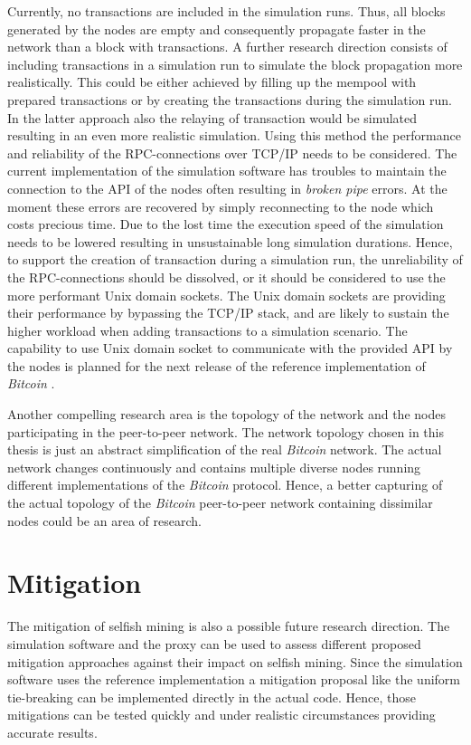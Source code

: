 Currently, no transactions are included in the simulation runs.
Thus, all blocks generated by the nodes are empty and consequently propagate faster in the network than a block with transactions.
A further research direction consists of including transactions in a simulation run to simulate the block propagation more realistically.
This could be either achieved by filling up the mempool with prepared transactions  or by creating the transactions during the simulation run.
In the latter approach also the relaying of transaction would be simulated resulting in an even more realistic simulation.
Using this method the performance and reliability of the RPC-connections over TCP/IP needs to be considered.
The current implementation of the simulation software has troubles to maintain the connection to the API of the nodes often resulting in \textit{broken pipe} errors.
At the moment these errors are recovered by simply reconnecting to the node which costs precious time.
Due to the lost time the execution speed of the simulation needs to be lowered resulting in unsustainable long simulation durations.
Hence, to support the creation of transaction during a simulation run, the unreliability of the RPC-connections should be dissolved, or it should be considered to use the more performant Unix domain sockets.
The Unix domain sockets are providing their performance by bypassing the TCP/IP stack, and are likely to sustain the higher workload when adding transactions to a simulation scenario.
The capability to use Unix domain socket to communicate with the provided API by the nodes is planned for the next release of the reference implementation of \textit{Bitcoin} \cite{bitcoinunixdomainsockets}.

Another compelling research area is the topology of the network and the nodes participating in the peer-to-peer network.
The network topology chosen in this thesis is just an abstract simplification of the real \textit{Bitcoin} network.
The actual network changes continuously and contains multiple diverse nodes running different implementations of the \textit{Bitcoin} protocol.
Hence, a better capturing of the actual topology of the \textit{Bitcoin} peer-to-peer network containing dissimilar nodes could be an area of research.

\section{Mitigation}

The mitigation of selfish mining is also a possible future research direction.
The simulation software and the proxy can be used to assess different proposed mitigation approaches \cite{eyal2014majority, billah2015one, solat2016zeroblock, zhang2017publish} against their impact on selfish mining.
Since the simulation software uses the reference implementation a mitigation proposal like the uniform tie-breaking \cite{eyal2014majority} can be implemented directly in the actual code.
Hence, those mitigations can be tested quickly and under realistic circumstances providing accurate results.
